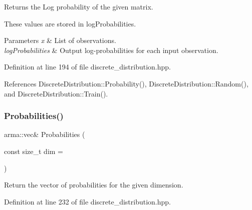 Returns the Log probability of the given matrix. 

These values are stored in log\+Probabilities.


\begin{DoxyParams}{Parameters}
{\em x} & List of observations. \\
\hline
{\em log\+Probabilities} & Output log-\/probabilities for each input observation. \\
\hline
\end{DoxyParams}


Definition at line 194 of file discrete\+\_\+distribution.\+hpp.



References Discrete\+Distribution\+::\+Probability(), Discrete\+Distribution\+::\+Random(), and Discrete\+Distribution\+::\+Train().

\mbox{\label{classmlpack_1_1distribution_1_1DiscreteDistribution_a5345d11b5eb6c28dbf0f252e1110909b}} 
\subsubsection{Probabilities()\hspace{0.1cm}{\footnotesize\ttfamily [1/2]}}
{\footnotesize\ttfamily arma\+::vec\& Probabilities (\begin{DoxyParamCaption}\item[{const size\+\_\+t}]{dim = {} }\end{DoxyParamCaption})\hspace{0.3cm}{\ttfamily [inline]}}



Return the vector of probabilities for the given dimension. 



Definition at line 232 of file discrete\+\_\+distribution.\+hpp.

\mbox{\label{classmlpack_1_1distribution_1_1DiscreteDistribution_a5742ca9717cead69c579e7a1af5f487d}} 
